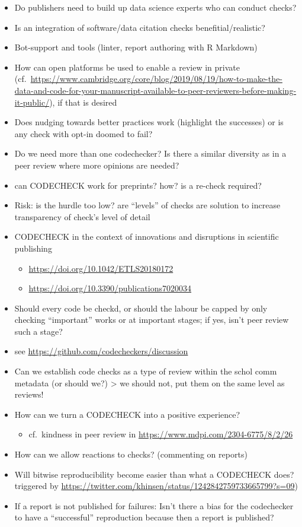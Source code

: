 \documentclass[12pt]{article}
\begin{document}
\begin{itemize}
\item
  Do publishers need to build up data science experts who can conduct
  checks?
\item
  Is an integration of software/data citation checks
  benefitial/realistic?
\item
  Bot-support and tools (linter, report authoring with R Markdown)
\item
  How can open platforms be used to enable a review in private
  (cf.~\url{https://www.cambridge.org/core/blog/2019/08/19/how-to-make-the-data-and-code-for-your-manuscript-available-to-peer-reviewers-before-making-it-public/}),
  if that is desired
\item
  Does nudging towards better practices work (highlight the successes)
  or is any check with opt-in doomed to fail?
\item
  Do we need more than one codechecker? Is there a similar diversity as
  in a peer review where more opinions are needed?
\item
  can CODECHECK work for preprints? how? is a re-check required?
\item
  Risk: is the hurdle too low? are ``levels'' of checks are solution to
  increase transparency of check's level of detail
\item
  CODECHECK in the context of innovations and disruptions in scientific
  publishing

  \begin{itemize}
  \item
    \url{https://doi.org/10.1042/ETLS20180172}
  \item
    \url{https://doi.org/10.3390/publications7020034}
  \end{itemize}
\item
  Should every code be checkd, or should the labour be capped by only
  checking ``important'' works or at important stages; if yes, isn't
  peer review such a stage?
\item
  see \url{https://github.com/codecheckers/discussion}
\item
  Can we establish code checks as a type of review within the schol comm
  metadata (or should we?) \textgreater{} we should not, put them on the
  same level as reviews!
\item
  How can we turn a CODECHECK into a positive experience?

  \begin{itemize}
  \item
    cf.~kindness in peer review in
    \url{https://www.mdpi.com/2304-6775/8/2/26}
  \end{itemize}
\item
  How can we allow reactions to checks? (commenting on reports)
\item
  Will bitwise reproducibility become easier than what a CODECHECK does?
  triggered by
  \url{https://twitter.com/khinsen/status/1242842759733665799?s=09})
\item
  If a report is not published for failures: Isn't there a bias for the
  codechecker to have a ``successful'' reproduction because then a
  report is published?
\end{itemize}
\end{document}
